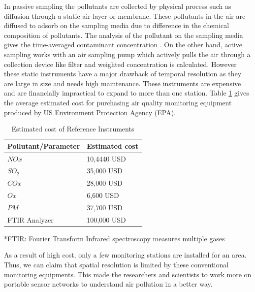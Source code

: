 \par

In passive sampling the pollutants are collected by physical process such as diffusion through a static air layer or membrane. These pollutants in the air are diffused to adsorb on the sampling media due to difference in the chemical composition of pollutants. The analysis of the pollutant on the sampling media gives the time-averaged contaminant concentration \cite{Environment2009}. On the other hand, active sampling works with an air sampling pump which actively pulls the air through a collection device like filter  and weighted concentration is calculated. However these static instruments have a major drawback of temporal resolution as they are large in size and needs high maintenance. These instruments are expensive and are financially impractical to expand to more than one station. Table \ref{table:cost} gives the average estimated cost for purchasing air quality monitoring equipment produced by US Environment Protection Agency (EPA). 

\begin{table}[h]
  
  
    \begin{tabularx}{\columnwidth}{X|X}
        \hline
        Pollutant/Parameter           & Estimated cost    \\
        \hline
    
      $NOx$   & 10,4440         USD \\ 
      $SO_2$   & 35,000          USD \\ 
      $COx$   & 28,000          USD\\ 
      $Ox$   & 6,600            USD\\ 
      $PM$   & 37,700           USD\\ 
     
      FTIR Analyzer   & 100,000 USD\\ \hline
     
        
      
  \end{tabularx}
  *FTIR: Fourier Transform Infrared spectroscopy measures multiple gases 
    \caption{Estimated cost of Reference Instruments \cite{Mussatti2000}}
    \label{table:cost}
  \end{table}


As a result of high cost, only a few monitoring stations are installed for an area. Thus, we can claim that spatial resolution is limited by these conventional monitoring equipments. This made the researchers and scientists to work more on portable sensor networks to understand air pollution in a better way.



